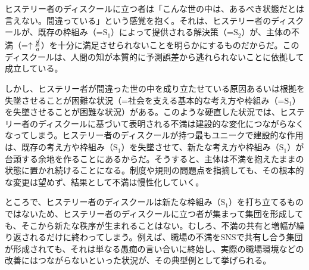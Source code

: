 \mbox{ヒステリー者のディスクール}に立つ者は「こんな世の中は、あるべき状態だとは言えない。間違っている」という感覚を抱く。それは、\mbox{ヒステリー者のディスクール}が、既存の枠組み（=\(\textrm{S}_1\)）によって提供される解決策（=\(\textrm{S}_2\)）が、主体の不満（=\(\uparrow\frac{\cancel{\textrm{S}}}{a}\)）を十分に満足させられないことを明らかにするものだからだ。このディスクールは、人間の知が本質的に\mbox{予測誤差}から逃れられないことに依拠して成立している。

しかし、ヒステリー者が間違った世の中を成り立たせている原因あるいは根拠を失墜させることが困難な状況（=社会を支える基本的な考え方や枠組み（=\(\textrm{S}_1\)）を失墜させることが困難な状況）がある。このような硬直した状況では、\mbox{ヒステリー者のディスクール}に基づいて表明される不満は建設的な変化につながらなくなってしまう。\mbox{ヒステリー者のディスクール}が持つ最もユニークで建設的な作用は、既存の考え方や枠組み（\(\textrm{S}_1\)）を失墜させて、新たな考え方や枠組み（\(\textrm{S}_1\)）が台頭する余地を作ることにあるからだ。そうすると、主体は不満を抱えたままの状態に置かれ続けることになる。制度や規則の問題点を指摘しても、その根本的な変更は望めず、結果として不満は慢性化していく。

ところで、\mbox{ヒステリー者のディスクール}は新たな枠組み（\(\textrm{S}_1\)）を打ち立てるものではないため、\mbox{ヒステリー者のディスクール}に立つ者が集まって集団を形成しても、そこから新たな秩序が生まれることはない。むしろ、不満の共有と増幅が繰り返されるだけに終わってしまう。例えば、職場の不満をSNSで共有し合う集団が形成されても、それは単なる愚痴の言い合いに終始し、実際の職場環境などの改善にはつながらないといった状況が、その典型例として挙げられる。

